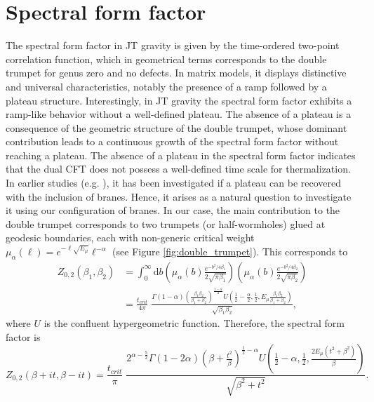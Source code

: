 \documentclass[a4paper,11pt]{article}
\newcommand{\rmd}{\mathrm{d}}
\begin{document}
\section{Spectral form factor}\label{section:SFF}
The spectral form factor in JT gravity is given by the time-ordered two-point correlation function, which in geometrical terms corresponds to the double trumpet for genus zero and no defects. 
In matrix models, it displays distinctive and universal characteristics, notably the presence of a ramp followed by a plateau structure. Interestingly, in JT gravity the spectral form factor exhibits a ramp-like behavior without a well-defined plateau.
The absence of a plateau is a consequence of the geometric structure of the double trumpet, whose dominant contribution leads to a continuous growth of the spectral form factor without reaching a plateau. The absence of a plateau in the spectral form factor indicates that the dual CFT does not possess a well-defined time scale for thermalization.\\
In earlier studies (e.g. \cite{Okuyama:2021FZZT}), it has been investigated if a plateau can be recovered with the inclusion of branes. Hence, it arises as a natural question to investigate it using our configuration of branes.
In our case, the main contribution to the double trumpet corresponds to two trumpets (or half-wormholes) glued at geodesic boundaries, each with non-generic critical weight $\mu_{\alpha}(\ell)= e^{-\ell \sqrt{E_\mu}}\ell^{-\alpha}$ (see Figure \ref{fig:double_trumpet}). This corresponds to
\begin{align}
    Z_{0,2}(\beta_1,\beta_2) &= \int_0^\infty \rmd b\left(\mu_\alpha(b)\frac{e^{-b^2/4\beta_1}}{2\sqrt{\pi \beta_1}}\right) \left(\mu_\alpha(b)\frac{e^{-b^2/4\beta_2}}{2\sqrt{\pi \beta_2}}\right)\\
    &=   \frac{t_{crit}}{4\pi}\; \frac{\Gamma (1-\alpha ) \left(\frac{\beta_1\beta_2}{\beta_1+\beta_2}\right)^{\frac{1-\alpha }{2}} U\left(\frac{1}{2}-\frac{\alpha }{2},\frac{1}{2},E_\mu\frac{ \beta_1 \beta_2}{\beta_1+\beta_2}\right)}{ \sqrt{\beta_1\beta_2}},
\end{align}
where $U$ is the confluent hypergeometric function. Therefore, the spectral form factor is 
\begin{equation}
    Z_{0,2}(\beta+it,\beta-it)=\frac{t_{crit}}{\pi}\;\frac{2^{\alpha -\frac{5}{2}} \Gamma (1-2 \alpha ) \left(\beta +\frac{t^2}{\beta }\right)^{\frac{1}{2}-\alpha } U\left(\frac{1}{2}-\alpha ,\frac{1}{2},\frac{2E_\mu \left(t^2+\beta ^2\right)}{\beta }\right)}{ \sqrt{\beta ^2+t^2}}.\label{eq:sff}
\end{equation}
\end{document}

